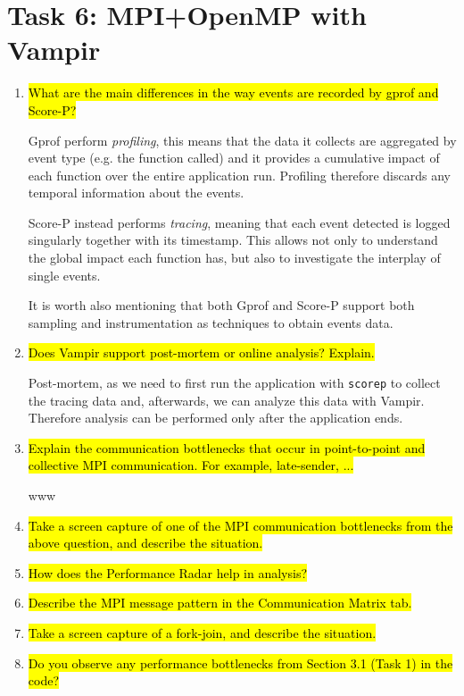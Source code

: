 \documentclass{article}
\begin{document}
\section{Task 6: MPI+OpenMP with Vampir}
\begin{enumerate}
	\item \hl{What are the main differences in the way events are recorded by gprof and Score-P?} ~

	Gprof perform \emph{profiling}, this means that the data it collects are aggregated by event type (e.g. the function called) and it provides a cumulative impact of each function over the entire application run. Profiling therefore discards any temporal information about the events.

	Score-P instead performs \emph{tracing}, meaning that each event detected is logged singularly together with its timestamp. This allows not only to understand the global impact each function has, but also to investigate the interplay of single events.

	It is worth also mentioning that both Gprof and Score-P support both sampling and instrumentation as techniques to obtain events data.

	\item \hl{Does Vampir support post-mortem or online analysis? Explain.} ~

	Post-mortem, as we need to first run the application with \verb!scorep! to collect the tracing data and, afterwards, we can analyze this data with Vampir. Therefore analysis can be performed only after the application ends.

	\item \hl{Explain the communication bottlenecks that occur in point-to-point and collective MPI communication. For example, late-sender, ...} ~

	www

	\item \hl{Take a screen capture of one of the MPI communication bottlenecks from the above question, and describe the situation.} ~

	\item \hl{How does the Performance Radar help in analysis?} ~

	\item \hl{Describe the MPI message pattern in the Communication Matrix tab.} ~

	\item \hl{Take a screen capture of a fork-join, and describe the situation.} ~

	\item \hl{Do you observe any performance bottlenecks from Section 3.1 (Task 1) in the code?} ~
\end{enumerate}

\end{document}
